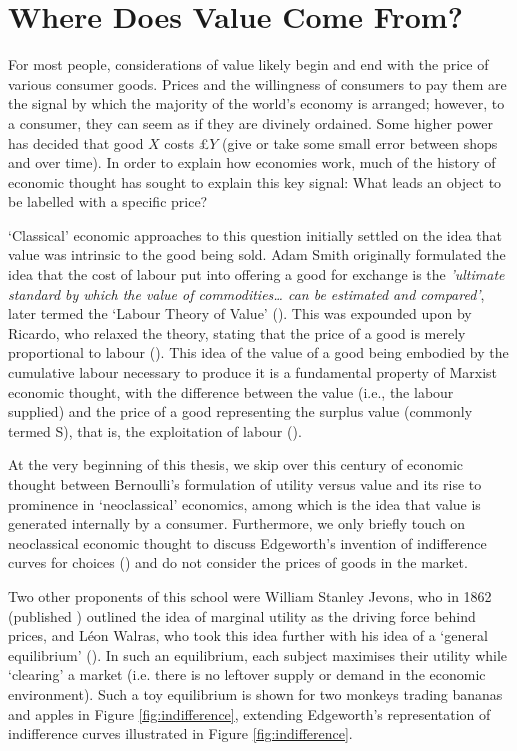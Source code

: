 \section{Where Does Value Come From?}

For most people, considerations of value likely begin and end with the price of various consumer goods. Prices and the willingness of consumers to pay them are the signal by which the majority of the world's economy is arranged; however, to a consumer, they can seem as if they are divinely ordained. Some higher power has decided that good $X$ costs £$Y$ (give or take some small error between shops and over time). In order to explain how economies work, much of the history of economic thought has sought to explain this key signal: What leads an object to be labelled with a specific price?

‘Classical’ economic approaches to this question initially settled on the idea that value was intrinsic to the good being sold. Adam Smith originally formulated the idea that the cost of labour put into offering a good for exchange is the \textit{'ultimate standard by which the value of commodities… can be estimated and compared'}, later termed the ‘Labour Theory of Value’ (\cite{smith1776inquiry}).  This was expounded upon by Ricardo, who relaxed the theory, stating that the price of a good is merely proportional to labour (\cite{stiglerRicardo93Labor1958}). This idea of the value of a good being embodied by the cumulative labour necessary to produce it is a fundamental property of Marxist economic thought, with the difference between the value (i.e., the labour supplied) and the price of a good representing the surplus value (commonly termed S), that is, the exploitation of labour (\cite{marx1867capital}).

At the very beginning of this thesis, we skip over this century of economic thought between Bernoulli’s formulation of utility versus value and its rise to prominence in ‘neoclassical’ economics, among which is the idea that value is generated internally by a consumer. Furthermore, we only briefly touch on neoclassical economic thought to discuss Edgeworth’s invention of indifference curves for choices (\cite{edgeworth1881mathematical}) and do not consider the prices of goods in the market.

Two other proponents of this school were William Stanley Jevons, who in 1862 (published \cite{jevonsMathematicalTheoryPolitical1874}) outlined the idea of marginal utility as the driving force behind prices, and Léon Walras, who took this idea further with his idea of a ‘general equilibrium’ (\cite{walras1954elements}). In such an equilibrium, each subject maximises their utility while ‘clearing’ a market (i.e. there is no leftover supply or demand in the economic environment). Such a toy equilibrium is shown for two monkeys trading bananas and apples in Figure \ref{fig:indifference}, extending Edgeworth's representation of indifference curves illustrated in Figure \ref{fig:indifference}.

